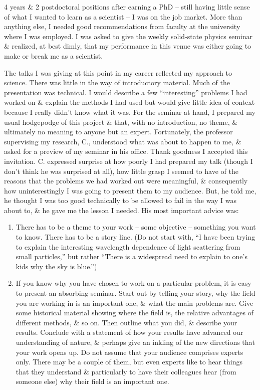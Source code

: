 \documentclass{article}
\begin{document}
\begin{enumerate}
\begin{itemize}
\begin{itemize}
			4 years \& 2 postdoctoral positions after earning a PhD -- still having little sense of what I wanted to learn as a scientist -- I was on the job market. More than anything else, I needed good recommendations from faculty at the university where I was employed. I was asked to give the weekly solid-state physics seminar \& realized, at best dimly, that my performance in this venue was either going to make or break me as a scientist.

			The talks I was giving at this point in my career reflected my approach to science. There was little in the way of introductory material. Much of the presentation was technical. I would describe a few ``interesting'' problems I had worked on \& explain the methods I had used but would give little idea of context because I really didn't know what it was. For the seminar at hand, I prepared my usual hodgepodge of this project \& that, with no introduction, no theme, \& ultimately no meaning to anyone but an expert. Fortunately, the professor supervising my research, C., understood what was about to happen to me, \& asked for a preview of my seminar in his office. Thank goodness I accepted this invitation. C. expressed surprise at how poorly I had prepared my talk (though I don't think he was surprised at all), how little grasp I seemed to have of the reasons that the problems we had worked out were meaningful, \& consequently how uninterestingly I was going to present them to my audience. But, he told me, he thought I was too good technically to be allowed to fail in the way I was about to, \& he gave me the lesson I needed. His most important advice was:
			\begin{enumerate}
				\item There has to be a theme to your work -- some objective -- something you want to know. There has to be a story line. (Do not start with, ``I have been trying to explain the interesting wavelength dependence of light scattering from small particles,'' but rather ``There is a widespread need to explain to one's kids why the sky is blue.'')
				\item If you know why you have chosen to work on a particular problem, it is easy to present an absorbing seminar. Start out by telling your story, why the field you are working in is an important one, \& what the main problems are. Give some historical material showing where the field is, the relative advantages of different methods, \& so on. Then outline what you did, \& describe your results. Conclude with a statement of how your results have advanced our understanding of nature, \& perhaps give an inkling of the new directions that your work opens up. Do not assume that your audience comprises experts only. There may be a couple of them, but even experts like to hear things that they understand \& particularly to have their colleagues hear (from someone else) why their field is an important one.

\end{enumerate}
\end{itemize}
\end{itemize}
\end{enumerate}
\end{document}

